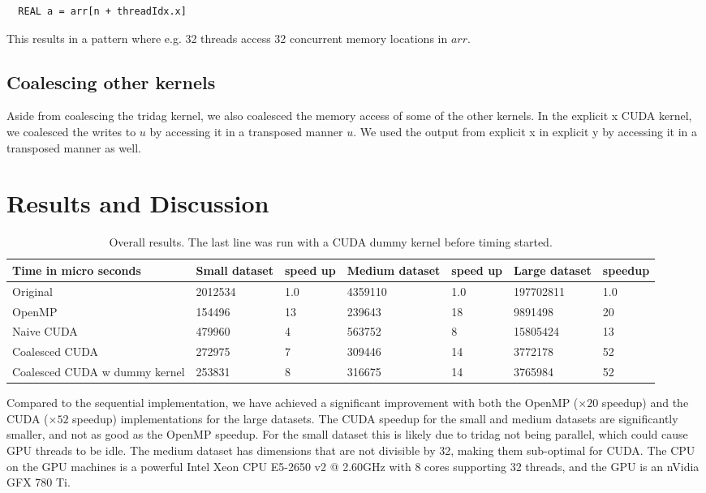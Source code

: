 \documentclass{article}
\begin{document}
\begin{verbatim}
  REAL a = arr[n + threadIdx.x]
\end{verbatim}
This results in a pattern where e.g. 32 threads access 32 concurrent memory locations in $arr$. 

\subsection*{Coalescing other kernels}
Aside from coalescing the tridag kernel, we also coalesced the memory access of some of the other kernels. In the explicit x CUDA kernel, we coalesced the writes to $u$ by accessing it in a transposed manner $u$. We used the output from explicit x in explicit y by accessing it in a transposed manner as well.

\section*{Results and Discussion}
\begin{table}[ht]
\centering
\caption{Overall results. The last line was run with a CUDA dummy kernel before timing started.}
\label{all}
\begin{tabular}{|l|l|l|l|l|l|l|}
\hline
Time in micro seconds & Small dataset & speed up & Medium dataset & speed up & Large dataset & speedup   \\ \hline
Original         & 2012534       &  1.0        & 4359110        &  1.0        & 197702811     &  1.0      \\ \hline
OpenMP           & 154496        &  13         & 239643         &  18         & 9891498       &  20       \\ \hline
Naive CUDA       & 479960        &  4          & 563752         &  8          & 15805424      &  13       \\ \hline
Coalesced CUDA   & 272975        &  7          & 309446         &  14         & 3772178       &  52       \\ \hline
Coalesced CUDA w dummy kernel  & 253831  & 8   & 316675         &  14         & 3765984       &  52       \\ \hline
\end{tabular}
\end{table}
Compared to the sequential implementation, we have achieved a significant improvement with both the OpenMP ($\times20$ speedup) and the CUDA ($\times52$ speedup) implementations for the large datasets. The CUDA speedup for the small and medium datasets are significantly smaller, and not as good as the OpenMP speedup. For the small dataset this is likely due to tridag not being parallel, which could cause GPU threads to be idle. The medium dataset has dimensions that are not divisible by 32, making them sub-optimal for CUDA. 
\newline\newline
The CPU on the GPU machines is a powerful Intel Xeon CPU E5-2650 v2 @ 2.60GHz with 8 cores supporting 32 threads, and the GPU is an nVidia GFX 780 Ti.
\end{document}
